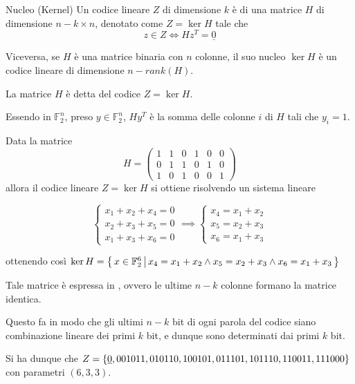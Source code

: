 \begin{definition}{Nucleo (Kernel)}
  Un codice lineare \(Z\) di dimensione \(k\) è  di una matrice \(H\) di dimensione \(n-k \times n\), denotato come \(Z = \ker H\) tale che
  \[z \in Z \iff H z^T = \underline{0}\]

  Viceversa, se \(H\) è una matrice binaria con \(n\) colonne, il suo nucleo \(\ker H\) è un codice lineare di dimensione \(n-rank(H)\).

  La matrice \(H\) è detta  del codice \(Z= \ker H\).
\end{definition}

\begin{note}{}
  Essendo in \(\mathbb{F}_2^n\), preso \(y \in \mathbb{F}_2^n\), \(Hy^T\) è la somma delle colonne \(i\) di \(H\) tali che \(y_i = 1\).
\end{note}

\begin{example}{}
  Data la matrice
  \[H = \begin{pmatrix}
    1 & 1 & 0 & 1 & 0 & 0 \\
    0 & 1 & 1 & 0 & 1 & 0 \\
    1 & 0 & 1 & 0 & 0 & 1
  \end{pmatrix}\]
  allora il codice lineare \(Z = \ker H\) si ottiene risolvendo un sistema lineare
  
  \[\begin{cases}
    x_1 + x_2 + x_4 = 0 \\
    x_2 + x_3 + x_5 = 0 \\
    x_1 + x_3 + x_6 = 0
  \end{cases} \implies \begin{cases}
    x_4 = x_1 + x_2 \\
    x_5 = x_2 + x_3 \\
    x_6 = x_1 + x_3
  \end{cases}\]

  ottenendo così \(\ker H = \set{x \in \mathbb{F}_2^6}[x_4=x_1+x_2 \land x_5 = x_2+x_3\land x_6 = x_1+x_3]\)

  Tale matrice è espressa in , ovvero le ultime \(n-k\) colonne formano la matrice identica. 
  
  Questo fa in modo che gli ultimi \(n-k\) bit di ogni parola del codice siano combinazione lineare dei primi \(k\) bit, e dunque sono determinati dai primi \(k\) bit.

  Si ha dunque che \(Z = \set{\underline{0}, 001011,010110,100101,011101,101110,110011,111000}\) con parametri \((6,3,3)\).
\end{example}

